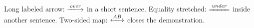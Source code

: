 \documentclass{article}
\begin{document}
Long labeled arrow: $\xlongrightarrow{over}$ in a short sentence.
Equality stretched: $\xlongequal{under}$ inside another sentence.
Two-sided map: $\xleftrightarrow{AB}$ closes the demonstration.
\end{document}
